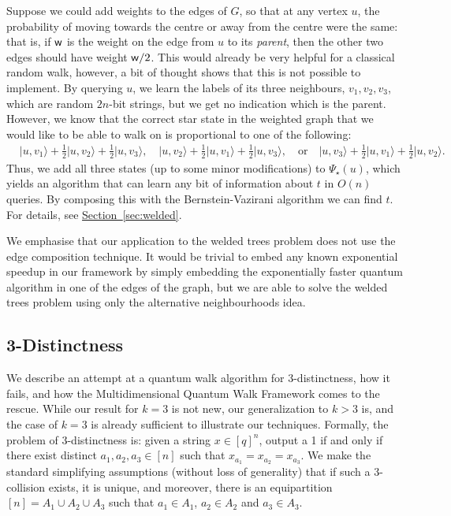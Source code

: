 \documentclass{article}
\renewcommand{\sec}[1]{\hyperref[sec:#1]{Section~\ref*{sec:#1}}}
\def\ket#1{{\lvert}#1\rangle}
\renewcommand{\>}{\rangle}
\newcommand{\<}{\langle}
\renewcommand{\(}{\left(}
\renewcommand{\)}{\right)}
\def\w{{\sf w}}
\begin{document}
Suppose we could add weights to the edges of $G$, so that at any vertex $u$, the probability of moving towards the centre or away from the centre were the same: that is, if $\w$ is the weight on the edge from $u$ to its \emph{parent}, then the other two edges should have weight $\w/2$. This would already be very helpful for a classical random walk, however, a bit of thought shows that this is not possible to implement. By querying $u$, we learn the labels of its three neighbours, $v_1,v_2,v_3$,  which are random $2n$-bit strings, but we get no indication which is the parent. However, we know that the correct star state in the weighted graph that we would like to be able to walk on is proportional to one of the following:
\begin{align*}
&\ket{u,v_1}+\frac{1}{2}\ket{u,v_2}+\frac{1}{2}\ket{u,v_3},
\quad
\ket{u,v_2}+\frac{1}{2}\ket{u,v_1}+\frac{1}{2}\ket{u,v_3},
\quad\mbox{or}\quad
\ket{u,v_3}+\frac{1}{2}\ket{u,v_1}+\frac{1}{2}\ket{u,v_2}.
\end{align*}
Thus, we add all three states (up to some minor modifications) to $\Psi_\star(u)$, which yields an algorithm that can learn any bit of information about $t$ in $O(n)$ queries. By composing this with the Bernstein-Vazirani algorithm we can find $t$. For details, see \sec{welded}. 

We emphasise that our application to the welded trees problem does not use the edge composition technique. It would be trivial to embed any known exponential speedup in our framework by simply embedding the exponentially faster quantum algorithm in one of the edges of the graph, but we are able to solve the welded trees problem using only the alternative neighbourhoods idea. 


\subsection{3-Distinctness}\label{sec:intro-3-dist}

We describe an attempt at a quantum walk algorithm for 3-distinctness, how it fails, and how the Multidimensional Quantum Walk Framework comes to the rescue. While our result for $k=3$ is not new, our generalization to $k>3$ is, and the case of $k=3$ is already sufficient to illustrate our techniques. 
Formally, the problem of 3-distinctness is: given a string $x\in [q]^n$, output a 1 if and only if there exist distinct $a_1,a_2,a_3\in [n]$ such that $x_{a_1}=x_{a_2}=x_{a_3}$. We make the standard simplifying assumptions (without loss of generality) that if such a 3-collision exists, it is unique, and moreover, there is an equipartition $[n]=A_1\cup A_2\cup A_3$ such that $a_1\in A_1$, $a_2\in A_2$ and $a_3\in A_3$. 
\end{document}
